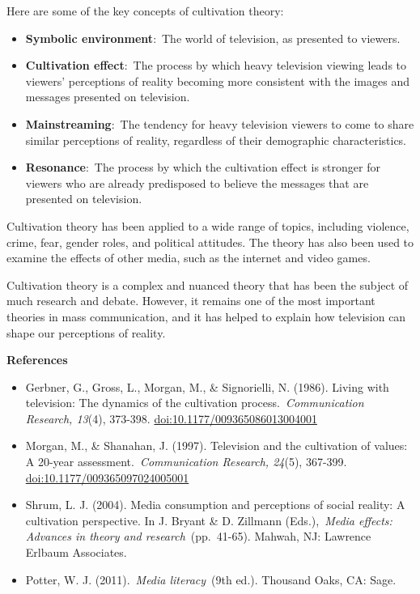 \documentclass[
  b5paper]{book}
\begin{document}
Here are some of the key concepts of cultivation theory:

\begin{itemize}
\item
  \textbf{Symbolic environment}:~The world of television, as presented to viewers.
\item
  \textbf{Cultivation effect}:~The process by which heavy television viewing leads to viewers' perceptions of reality becoming more consistent with the images and messages presented on television.
\item
  \textbf{Mainstreaming}:~The tendency for heavy television viewers to come to share similar perceptions of reality, regardless of their demographic characteristics.
\item
  \textbf{Resonance}:~The process by which the cultivation effect is stronger for viewers who are already predisposed to believe the messages that are presented on television.
\end{itemize}

Cultivation theory has been applied to a wide range of topics, including violence, crime, fear, gender roles, and political attitudes. The theory has also been used to examine the effects of other media, such as the internet and video games.

Cultivation theory is a complex and nuanced theory that has been the subject of much research and debate. However, it remains one of the most important theories in mass communication, and it has helped to explain how television can shape our perceptions of reality.

\textbf{References}

\begin{itemize}
\item
  Gerbner, G., Gross, L., Morgan, M., \& Signorielli, N. (1986). Living with television: The dynamics of the cultivation process.~\emph{Communication Research, 13}(4), 373-398. \url{doi:10.1177/009365086013004001}
\item
  Morgan, M., \& Shanahan, J. (1997). Television and the cultivation of values: A 20-year assessment.~\emph{Communication Research, 24}(5), 367-399. \url{doi:10.1177/009365097024005001}
\item
  Shrum, L. J. (2004). Media consumption and perceptions of social reality: A cultivation perspective. In J. Bryant \& D. Zillmann (Eds.),~\emph{Media effects: Advances in theory and research}~(pp.~41-65). Mahwah, NJ: Lawrence Erlbaum Associates.
\item
  Potter, W. J. (2011).~\emph{Media literacy}~(9th ed.). Thousand Oaks, CA: Sage.
\end{itemize}
\end{document}
